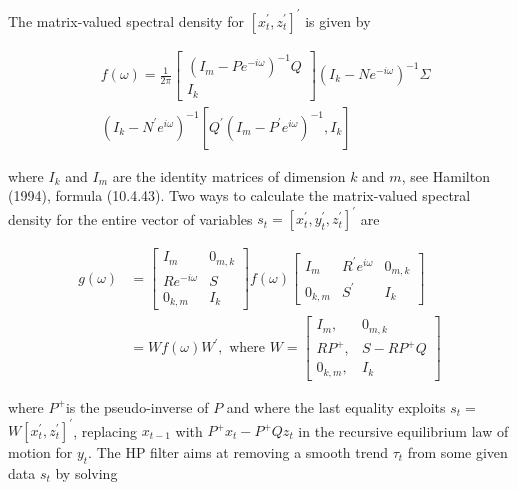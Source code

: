 \documentclass[10pt]{article}
\begin{document}
The matrix-valued spectral density for $\left[x_{t}^{\prime}, z_{t}^{\prime}\right]^{\prime}$ is given by

\begin{equation*}
\begin{aligned}
& f(\omega)=\frac{1}{2 \pi}\left[\begin{array}{l}
\left(I_{m}-P e^{-i \omega}\right)^{-1} Q \\
I_{k}
\end{array}\right]\left(I_{k}-N e^{-i \omega}\right)^{-1} \Sigma \\
& \left(I_{k}-N^{\prime} e^{i \omega}\right)^{-1}\left[Q^{\prime}\left(I_{m}-P^{\prime} e^{i \omega}\right)^{-1}, I_{k}\right]
\end{aligned}
\end{equation*}

where $I_{k}$ and $I_{m}$ are the identity matrices of dimension $k$ and $m$, see Hamilton (1994), formula (10.4.43). Two ways to calculate the matrix-valued spectral density for the entire vector of variables $s_{t}=\left[x_{t}^{\prime}, y_{t}^{\prime}, z_{t}^{\prime}\right]^{\prime}$ are

\begin{equation*}
\begin{aligned}
g(\omega) & =\left[\begin{array}{cc}
I_{m} & 0_{m, k} \\
R e^{-i \omega} & S \\
0_{k, m} & I_{k}
\end{array}\right] f(\omega)\left[\begin{array}{ccc}
I_{m} & R^{\prime} e^{i \omega} & 0_{m, k} \\
0_{k, m} & S^{\prime} & I_{k}
\end{array}\right] \\
& =W f(\omega) W^{\prime}, \text { where } W=\left[\begin{array}{cc}
I_{m}, & 0_{m, k} \\
R P^{+}, & S-R P^{+} Q \\
0_{k, m}, & I_{k}
\end{array}\right]
\end{aligned}
\end{equation*}

where $P^{+}$is the pseudo-inverse of $P$ and where the last equality exploits $s_{t}=$ $W\left[x_{t}^{\prime}, z_{t}^{\prime}\right]^{\prime}$, replacing $x_{t-1}$ with $P^{+} x_{t}-P^{+} Q z_{t}$ in the recursive equilibrium law of motion for $y_{t}$. The HP filter aims at removing a smooth trend $\tau_{t}$ from some given data $s_{t}$ by solving
\end{document}

